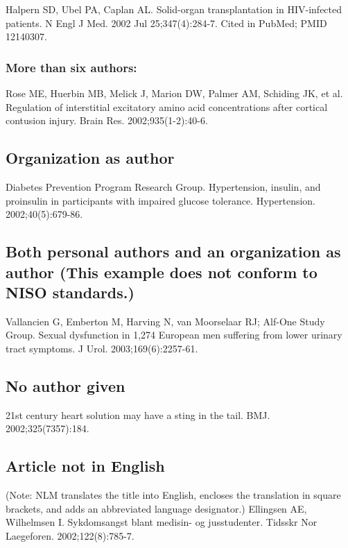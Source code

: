 \documentclass[a4paper,10pt]{article}
\begin{document}
Halpern SD, Ubel PA, Caplan AL. Solid-organ transplantation in HIV-infected patients. N Engl J Med. 2002 Jul 25;347(4):284-7. Cited in PubMed; PMID 12140307.\cite{halpern.ubel.ea:solid-organ*1}

\subsubsection{More than six authors:}

Rose ME, Huerbin MB, Melick J, Marion DW, Palmer AM, Schiding JK, et al. Regulation of interstitial excitatory amino acid concentrations after cortical contusion injury. Brain Res. 2002;935(1-2):40-6.\cite{rose.huerbin.ea:regulation}

\subsection{Organization as author}

Diabetes Prevention Program Research Group. Hypertension, insulin, and proinsulin in participants with impaired glucose tolerance. Hypertension. 2002;40(5):679-86.\cite{hypertension}

\subsection{Both personal authors and an organization as author (This example does not conform to NISO standards.)}

Vallancien G, Emberton M, Harving N, van Moorselaar RJ; Alf-One Study Group. Sexual dysfunction in 1,274 European men suffering from lower urinary tract symptoms. J Urol. 2003;169(6):2257-61.\cite{vallancien.emberton.ea:sexual}

\subsection{No author given}

21st century heart solution may have a sting in the tail. BMJ. 2002;325(7357):184.\cite{21st}

\subsection{Article not in English}

(Note: NLM translates the title into English, encloses the translation in square brackets, and adds an abbreviated language designator.)
\linebreak
Ellingsen AE, Wilhelmsen I. Sykdomsangst blant medisin- og jusstudenter. Tidsskr Nor Laegeforen. 2002;122(8):785-7.\cite{ellingsen.wilhelmsen:sykdomsangst}
\end{document}
